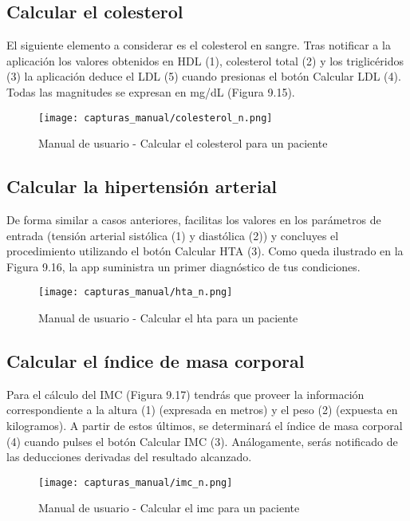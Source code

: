 \documentclass[11pt,spanish,
		listoftables,listoffigures]
		{tfgplantilla}
\begin{document}
\subsection {Calcular el colesterol}

El siguiente elemento a considerar es el colesterol en sangre. Tras notificar a la aplicación los valores obtenidos en HDL (1), colesterol total (2) y los triglicéridos (3) la aplicación deduce el LDL (5) cuando presionas el botón \textquotedbl Calcular LDL\textquotedbl{} (4). Todas las magnitudes se expresan en mg/dL (Figura 9.15).

\begin{figure}[H]
\centering
\texttt{[image: capturas\_manual/colesterol\_n.png]}
\caption{Manual de usuario - Calcular el colesterol para un paciente}
\end{figure}

\subsection {Calcular la hipertensión arterial}

De forma similar a casos anteriores, facilitas los valores en los parámetros de entrada (tensión arterial sistólica (1) y diastólica (2)) y concluyes el procedimiento utilizando el botón \textquotedbl Calcular HTA\textquotedbl{} (3). Como queda ilustrado en la Figura 9.16, la app suministra un primer diagnóstico de tus condiciones.

\begin{figure}[H]
\centering
\texttt{[image: capturas\_manual/hta\_n.png]}
\caption{Manual de usuario - Calcular el hta para un paciente}
\end{figure}

\newpage
\subsection {Calcular el índice de masa corporal}

Para el cálculo del IMC (Figura 9.17) tendrás que proveer la información correspondiente a la altura (1) (expresada en metros) y el peso (2) (expuesta en kilogramos). A partir de estos últimos, se determinará el índice de masa corporal (4) cuando pulses el botón \textquotedbl Calcular IMC\textquotedbl{} (3). Análogamente, serás notificado de las deducciones derivadas del resultado alcanzado.

\begin{figure}[H]
\centering
\texttt{[image: capturas\_manual/imc\_n.png]}
\caption{Manual de usuario - Calcular el imc para un paciente}
\end{figure}
\end{document}

